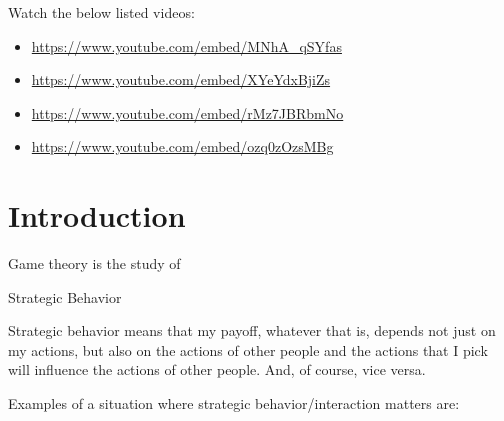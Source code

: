 \documentclass[
]{book}
\begin{document}
Watch the below listed videos:

\begin{itemize}
\item
  \url{https://www.youtube.com/embed/MNhA_qSYfas}
\item
  \url{https://www.youtube.com/embed/XYeYdxBjiZs}
\item
  \url{https://www.youtube.com/embed/rMz7JBRbmNo}
\item
  \url{https://www.youtube.com/embed/ozq0zOzsMBg}
\end{itemize}

\hypertarget{introduction-1}{%
\section{Introduction}\label{introduction-1}}

Game theory is the study of

\begin{center}
Strategic Behavior

\end{center}

Strategic behavior means that my payoff, whatever that is, depends not just on my actions, but also on the actions of other people and the actions that I pick will influence the actions of other people. And, of course, vice versa.

Examples of a situation where strategic behavior/interaction matters are:
\end{document}
